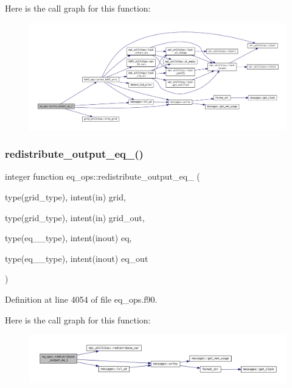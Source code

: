 Here is the call graph for this function\+:
\nopagebreak
\begin{figure}[H]
\begin{center}
\leavevmode
\includegraphics[width=350pt]{namespaceeq__ops_a479e914bb96e5269af860cae149e1a73_cgraph}
\end{center}
\end{figure}
\mbox{\label{namespaceeq__ops_adc3d3173255a02f750a4d2c0f1b30044}} 
\subsubsection{\texorpdfstring{redistribute\+\_\+output\+\_\+eq\+\_()}{redistribute\_output\_eq\_1()}}
{\footnotesize\ttfamily integer function eq\+\_\+ops\+::redistribute\+\_\+output\+\_\+eq\+\_ (\begin{DoxyParamCaption}\item[{type(grid\+\_\+type), intent(in)}]{grid,  }\item[{type(grid\+\_\+type), intent(in)}]{grid\+\_\+out,  }\item[{type(eq\+\_\+1\+\_\+type), intent(inout)}]{eq,  }\item[{type(eq\+\_\+1\+\_\+type), intent(inout)}]{eq\+\_\+out }\end{DoxyParamCaption})}



Definition at line 4054 of file eq\+\_\+ops.\+f90.

Here is the call graph for this function\+:
\nopagebreak
\begin{figure}[H]
\begin{center}
\leavevmode
\includegraphics[width=350pt]{namespaceeq__ops_adc3d3173255a02f750a4d2c0f1b30044_cgraph}
\end{center}
\end{figure}
\mbox{\label{namespaceeq__ops_a34003959915249394273824108af61e0}} 

